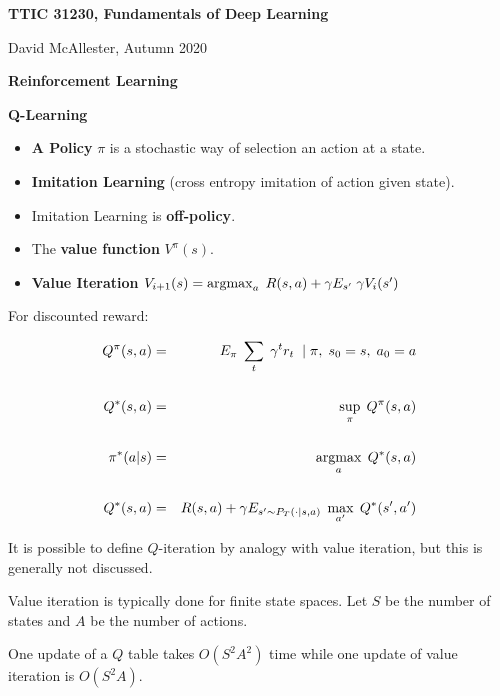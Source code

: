 




{\Huge

  \centerline{\bf TTIC 31230, Fundamentals of Deep Learning}
  \bigskip
  \centerline{David McAllester, Autumn 2020}
\vfill
  \centerline{\bf Reinforcement Learning}
  \vfill
  \centerline{\bf Q-Learning}
  \vfill
\vfill


\begin{itemize}
\item {\bf A Policy} $\pi$ is a stochastic way of selection an action at a state.

\vfill
\item {\bf Imitation Learning} (cross entropy imitation of action given state).

\vfill
\item Imitation Learning is {\bf off-policy}.

\vfill
\item The {\bf value function} $V^\pi(s)$.

\vfill
\item {\bf Value Iteration} $V_{i+1}(s) = \operatorname*{argmax}_a\;R(s,a) + \gamma E_{s'}\;\gamma V_i(s')$
\end{itemize}


For discounted reward:

\begin{eqnarray*}
  Q^\pi(s,a) & = & E_\pi\;\sum_t \;\gamma^tr_t \;\;|\; \pi, \; s_0 = s,\;a_0 = a \\
  \\
  Q^*(s,a) & = & \sup_\pi \;Q^\pi(s,a) \\
  \\
  \pi^*(a|s) & = & \operatorname*{argmax}_a\;Q^*(s,a) \\
  \\
  Q^*(s,a) & = & R(s,a) + \gamma E_{s' \sim P_T(\cdot|s,a)}\;\max_{a'}\; Q^*(s',a')
\end{eqnarray*}


It is possible to define $Q$-iteration by analogy with value iteration, but this is generally not discussed.

\vfill
Value iteration is typically done for finite state spaces.  Let $S$ be the number of states and $A$ be the number of actions.

\vfill
One update of a $Q$ table takes $O(S^2A^2)$ time while one update of value iteration is $O(S^2A)$.

}
